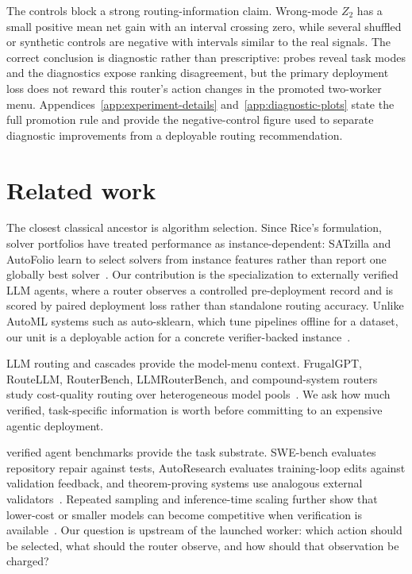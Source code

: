 \documentclass{article}
\newcounter{algorithm}
\begin{document}
The controls block a strong routing-information claim.
Wrong-mode \(Z_2\) has a small positive mean net gain with an interval crossing zero, while several shuffled or synthetic controls are negative with intervals similar to the real signals.
The correct conclusion is diagnostic rather than prescriptive: probes reveal task modes and the diagnostics expose ranking disagreement, but the primary deployment loss does not reward this router's action changes in the promoted two-worker menu.
Appendices~\ref{app:experiment-details} and~\ref{app:diagnostic-plots} state the full promotion rule and provide the negative-control figure used to separate diagnostic improvements from a deployable routing recommendation.

\section{Related work}
\label{sec:related}

The closest classical ancestor is algorithm selection.
Since Rice's formulation, solver portfolios have treated performance as instance-dependent: SATzilla and AutoFolio learn to select solvers from instance features rather than report one globally best solver~\citep{rice1976algorithm,xu2012satzilla,lindauer2015autofolio,kotthoff2016algorithm}.
Our contribution is the specialization to externally verified LLM agents, where a router observes a controlled pre-deployment record and is scored by paired deployment loss rather than standalone routing accuracy.
Unlike AutoML systems such as auto-sklearn, which tune pipelines offline for a dataset, our unit is a deployable action for a concrete verifier-backed instance~\citep{feurer2015autosklearn}.

LLM routing and cascades provide the model-menu context.
FrugalGPT, RouteLLM, RouterBench, LLMRouterBench, and compound-system routers study cost-quality routing over heterogeneous model pools~\citep{chen2023frugalgpt,ong2024routellm,hu2024routerbench,anonymous2026llmrouterbench,chen2025optimizing,yue2025masrouter,zaharia2024compound}.
We ask how much verified, task-specific information is worth before committing to an expensive agentic deployment.

verified agent benchmarks provide the task substrate.
SWE-bench evaluates repository repair against tests, AutoResearch evaluates training-loop edits against validation feedback, and theorem-proving systems use analogous external validators~\citep{jimenez2024swebench,karpathy2026autoresearch}.
Repeated sampling and inference-time scaling further show that lower-cost or smaller models can become competitive when verification is available~\citep{brown2024monkeys,snell2025testtime,wu2025inference,osca2024}.
Our question is upstream of the launched worker: which action should be selected, what should the router observe, and how should that observation be charged?
\end{document}

